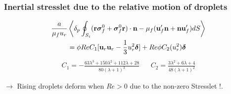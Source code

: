 \documentclass{sintefbeamer}
\begin{document}
\begin{frame}
  \frametitle{Inertial stresslet due to the relative motion of droplets}


  \begin{align*}
    \frac{a}{\mu_f u_r}
        &\left<\delta_p \oint_{S_{i}} (\textbf{r}\bm{\sigma}_f^0 +\bm{\sigma}_f^0 \textbf{r} )\cdot \textbf{n}-\mu_f(\textbf{u}_f'\textbf{n} +\textbf{n}\textbf{u}_f') dS\right>\\
    &=
    \phi Re C_1
    [
      \textbf{u}_r\textbf{u}_r - \frac{1}{3}u_r ^2\bm\delta 
      ]
      + Re \phi C_2 (u_r ^2) \bm\delta
  \end{align*} 
\begin{align*}
    C_1  =  -\frac{63 \lambda^{3} + 150 \lambda^{2} + 112 \lambda + 28}{80 \left(\lambda + 1\right)^{3}}
    &&
    C_2  = \frac{3\lambda^2 + 6\lambda + 4}{48(\lambda +1 )^2}
  \end{align*}
  
  $\to$ Rising droplets deform when $Re > 0$ due to the non-zero Stresslet !. 

\end{frame}
\end{document}
